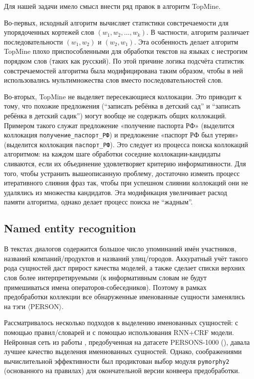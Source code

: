 Для нашей задачи имело смысл внести ряд правок в алгоритм TopMine. 

Во-первых, исходный алгоритм вычисляет статистики совстречаемости для упорядоченных кортежей слов $(w_1, w_2, \dots, w_k)$. В частности, алгоритм различает последовательности $(w_1, w_2)$ и $(w_2, w_1)$. Эта особенность делает алгоритм TopMine плохо приспособленными для обработки текстов на языках с нестрогим порядком слов (таких как русский). По этой причине логика подсчёта статистик совстречаемостей алгоритма была модифицирована таким образом, чтобы в ней использовались мультимножества слов вместо последовательностей слов.

Во-вторых, TopMine не выделяет пересекающиеся коллокации. Это приводит к тому, что похожие предложения (``записать ребёнка в детский сад'' и ``записать ребёнка в детский садик'') могут вообще не содержать общих коллокаций. Примером такого служат предложение «получение паспорта РФ» (выделится коллокация \texttt{получение\_паспорт\_РФ}) и предложение «паспорт РФ был утерян» (выделится коллокация \texttt{паспорт\_РФ}). Это следует из процесса поиска коллокаций алгоритмом: на каждом шаге обработки соседние коллокации-кандидаты сливаются, если их объединение удовлетворяет критерию информативности. Для того, чтобы устранить вышеописанную проблему, достаточно измеить процесс итеративного слияния фраз так, чтобы при успешном слиянии коллокаций они не удалялись из множества кандидатов. Эта модификация увеличивает расход памяти алгоритма, однако делает процесс поиска не ``жадным''.

\subsection{Named entity recognition}

\par В текстах диалогов содержится большое число упоминаний имён участников, названий компаний/продуктов и названий улиц/городов. Аккуратный учёт такого рода сущностей даст прирост качества моделей, а также сделает списки верхних слов более интерпретируемыми (к информативным словам не будут примешиваться имена операторов-собеседников).
Поэтому в рамках предобработки коллекции все обнаруженные именованные сущности заменялись на тэги $\langle \mathrm{PERSON} \rangle$.

Рассматривалось несколько подходов к выделению именованных сущностей: с помощью правил/словарей и с помощью использования RNN+CRF модели. 
Нейронная сеть из работы \cite{burtsev}, предобученная на датасете PERSONS-1000 (\cite{persona}), давала лучшее качество выделения именнованных сущностей. Однако, соображениями вычислительной эффективности был продиктован выбор модуля \texttt{pymorphy2} (основанного на правилах) для окончательной версии конвеера предобработки.

